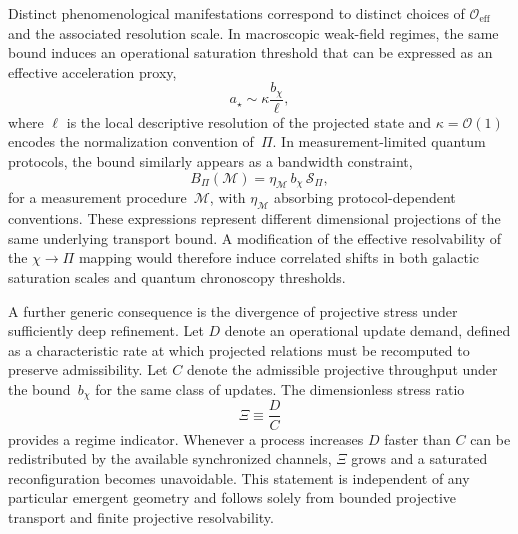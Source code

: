   Distinct phenomenological manifestations correspond to distinct choices of
  $\mathcal{O}_{\mathrm{eff}}$ and the associated resolution scale.
  In macroscopic weak-field regimes, the same bound induces an operational saturation
  threshold that can be expressed as an effective acceleration proxy,
  \begin{equation}
    a_{\star} \sim \kappa \frac{b_{\chi}}{\ell},
    \label{eq:a_star_b_relation}
  \end{equation}
  where $\ell$ is the local descriptive resolution of the projected state and
  $\kappa=\mathcal{O}(1)$ encodes the normalization convention of~$\Pi$.
  In measurement-limited quantum protocols, the bound similarly appears as a bandwidth
  constraint,
  \begin{equation}
    B_{\Pi}(\mathcal{M})
    = \eta_{\mathcal{M}}\,b_{\chi}\,\mathcal{S}_{\Pi},
    \label{eq:bandwidth_b_relation}
  \end{equation}
  for a measurement procedure~$\mathcal{M}$, with $\eta_{\mathcal{M}}$ absorbing
  protocol-dependent conventions.
  These expressions represent different dimensional projections of the same underlying
  transport bound.
  A modification of the effective resolvability of the $\chi \rightarrow \Pi$ mapping
  would therefore induce correlated shifts in both galactic saturation scales and quantum
  chronoscopy thresholds.

  A further generic consequence is the divergence of projective stress under sufficiently
  deep refinement.
  Let $D$ denote an operational update demand, defined as a characteristic rate at which
  projected relations must be recomputed to preserve admissibility.
  Let $C$ denote the admissible projective throughput under the bound~$b_{\chi}$ for the
  same class of updates.
  The dimensionless stress ratio
  \begin{equation}
    \Xi \equiv \frac{D}{C}
  \end{equation}
  provides a regime indicator.
  Whenever a process increases $D$ faster than $C$ can be redistributed by the available
  synchronized channels, $\Xi$ grows and a saturated reconfiguration becomes unavoidable.
  This statement is independent of any particular emergent geometry and follows solely
  from bounded projective transport and finite projective resolvability.
